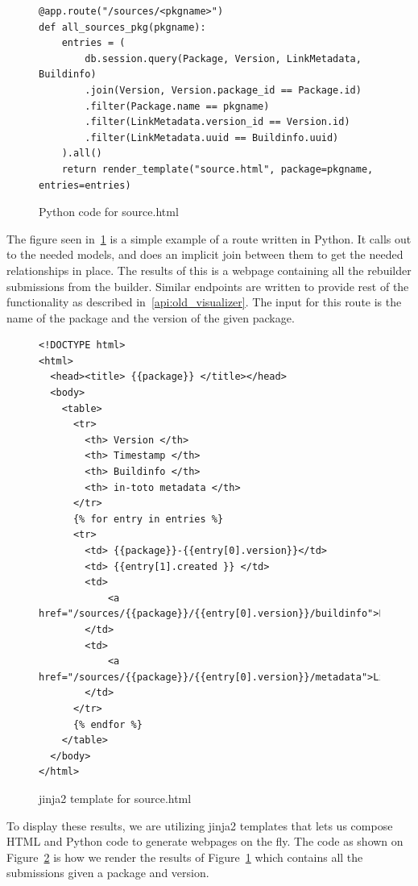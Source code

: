 \documentclass[../Main/thesis.tex]{subfiles}
\begin{document}
\begin{figure}[H]
\begin{verbatim}
@app.route("/sources/<pkgname>")
def all_sources_pkg(pkgname):
    entries = (
        db.session.query(Package, Version, LinkMetadata, Buildinfo)
        .join(Version, Version.package_id == Package.id)
        .filter(Package.name == pkgname)
        .filter(LinkMetadata.version_id == Version.id)
        .filter(LinkMetadata.uuid == Buildinfo.uuid)
    ).all()
    return render_template("source.html", package=pkgname, entries=entries)
\end{verbatim}
\caption{Python code for source.html}
\label{fig:python-source}
\end{figure}

The figure seen in~\ref{fig:python-source} is a simple example of a route
written in Python. It calls out to the needed models, and does an implicit join
between them to get the needed relationships in place. The results of this is a
webpage containing all the rebuilder submissions from the builder. Similar
endpoints are written to provide rest of the functionality as described
in~\ref{api:old_visualizer}. The input for this route is the name of the package
and the version of the given package.


\begin{figure}[H]
\begin{verbatim}
<!DOCTYPE html>
<html>
  <head><title> {{package}} </title></head>
  <body>
    <table>
      <tr>
        <th> Version </th>
        <th> Timestamp </th>
        <th> Buildinfo </th>
        <th> in-toto metadata </th>
      </tr>
      {% for entry in entries %}
      <tr>
        <td> {{package}}-{{entry[0].version}}</td>
        <td> {{entry[1].created }} </td>
        <td> 
            <a href="/sources/{{package}}/{{entry[0].version}}/buildinfo">Link</a>
        </td>
        <td> 
            <a href="/sources/{{package}}/{{entry[0].version}}/metadata">Link</a>
        </td>
      </tr>
      {% endfor %}
    </table>
  </body>
</html>
\end{verbatim}
\caption{jinja2 template for source.html}
\label{fig:jinja-source}
\end{figure}

To display these results, we are utilizing jinja2 templates that lets us compose
HTML and Python code to generate webpages on the fly. The code as shown on
Figure~\ref{fig:jinja-source} is how we render the results of
Figure~\ref{fig:python-source} which contains all the submissions given a
package and version.
\end{document}
